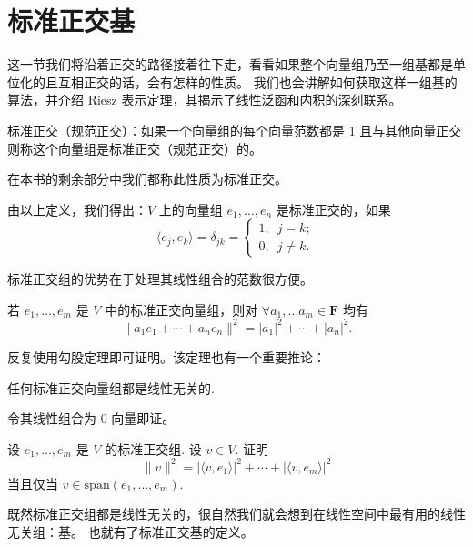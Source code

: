\section{标准正交基}

这一节我们将沿着正交的路径接着往下走，看看如果整个向量组乃至一组基都是单位化的且互相正交的话，会有怎样的性质。
我们也会讲解如何获取这样一组基的算法，并介绍 Riesz 表示定理，其揭示了线性泛函和内积的深刻联系。

\begin{definition}
    标准正交（规范正交）：如果一个向量组的每个向量范数都是 1 且与其他向量正交
    则称这个向量组是标准正交（规范正交）的。
\end{definition}

在本书的剩余部分中我们都称此性质为标准正交。

由以上定义，我们得出：$ V $ 上的向量组 $ e_1, \ldots , e_n $ 是标准正交的，如果
\[ \langle e_j, e_k \rangle = \delta _{jk} = 
\begin{cases}
    1, \enspace j = k; \\
    0, \enspace j \neq k.
\end{cases}\]

标准正交组的优势在于处理其线性组合的范数很方便。

\begin{theorem}
    若 $e_1, \ldots , e_m$ 是 $ V $ 中的标准正交向量组，则对 $\forall a_1, \ldots a_m \in \mathbf{F}$ 均有
    \[ \lVert a_1e_1 + \cdots + a_ne_n\rVert^2 = \lvert a_1 \rvert^2 + \cdots + \lvert a_n \rvert^2.\]
\end{theorem}

反复使用勾股定理即可证明。该定理也有一个重要推论：

\begin{theorem}
    任何标准正交向量组都是线性无关的.
\end{theorem}

令其线性组合为 0 向量即证。

\begin{example}
    设 $e_1, \ldots , e_m$ 是 $ V $ 的标准正交组. 设 $ v \in V $. 证明
    \[ \lVert v \rVert^2 = \lvert \langle v, e_1\rangle \rvert^2 + \cdots + \lvert \langle v, e_m\rangle \rvert^2 \]
    当且仅当 $ v \in \mathrm{span}(e_1, \ldots , e_m).$
\end{example}

\vspace{2ex}

既然标准正交组都是线性无关的，很自然我们就会想到在线性空间中最有用的线性无关组：基。
也就有了标准正交基的定义。

